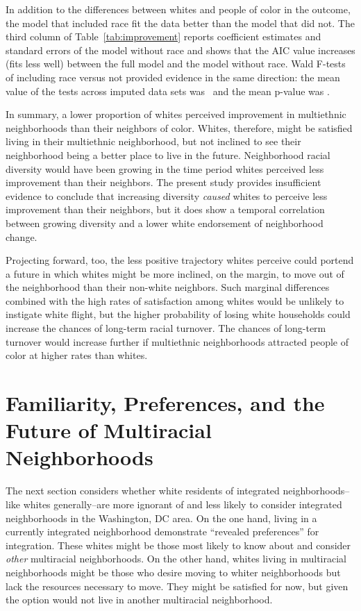 \documentclass{baderart}
\begin{document}

In addition to the differences between whites and people of color in the outcome, the model that included race fit the data better than the model that did not. The third column of Table~\ref{tab:improvement} reports coefficient estimates and standard errors of the model without race and shows that the AIC value increases (fits less well) between the full model and the model without race. Wald F-tests of including race versus not provided evidence in the same direction: the mean value of the tests across imputed data sets was \betWaldF~and the mean p-value was \betWaldp.

In summary, a lower proportion of whites perceived improvement in multiethnic neighborhoods than their neighbors of color. Whites, therefore, might be satisfied living in their multiethnic neighborhood, but not inclined to see their neighborhood being a better place to live in the future. Neighborhood racial diversity would have been growing in the time period whites perceived less improvement than their neighbors. The present study provides insufficient evidence to conclude that increasing diversity \emph{caused} whites to perceive less improvement than their neighbors, but it does show a temporal correlation between growing diversity and a lower white endorsement of neighborhood change.

Projecting forward, too, the less positive trajectory whites perceive could portend a future in which whites might be more inclined, on the margin, to move out of the neighborhood than their non-white neighbors. Such marginal differences combined with the high rates of satisfaction among whites would be unlikely to instigate white flight, but the higher probability of losing white households could increase the chances of long-term racial turnover. The chances of long-term turnover would increase further if multiethnic neighborhoods attracted people of color at higher rates than whites.

\section{Familiarity, Preferences, and the Future of Multiracial Neighborhoods}

The next section considers whether white residents of integrated neighborhoods--like whites generally--are more ignorant of and less likely to consider integrated neighborhoods in the Washington, DC area. On the one hand, living in a currently integrated neighborhood demonstrate ``revealed preferences'' for integration. These whites might be those most likely to know about and consider \emph{other} multiracial neighborhoods. On the other hand, whites living in multiracial neighborhoods might be those who desire moving to whiter neighborhoods but lack the resources necessary to move. They might be satisfied for now, but given the option would not live in another multiracial neighborhood.
\end{document}
